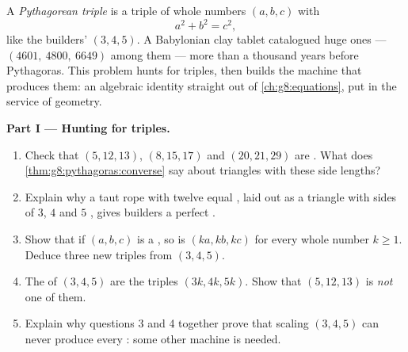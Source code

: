 \begin{problem}[{Weekend problem --- whole-number right triangles,
and the identity $(m^2 - n^2)^2 + (2mn)^2 = (m^2 + n^2)^2$ that
generates them all}]
\label{pb:g8:pythagoras:1}
A \emph{Pythagorean triple} is a triple
of whole numbers $(a, b, c)$ with
\[
a^2 + b^2 = c^2 ,
\]
like the builders' $(3, 4, 5)$. A Babylonian clay tablet catalogued
huge ones --- $(4601,\ 4800,\ 6649)$ among them --- more than a
thousand years before Pythagoras. This problem hunts for triples,
then builds the machine that produces them: an algebraic identity
straight out of \cref{ch:g8:equations}, put in the service of
geometry.

\medskip
\noindent\textbf{Part I --- Hunting for triples.}
\begin{enumerate}
  \item Check that $(5, 12, 13)$, $(8, 15, 17)$ and
        $(20, 21, 29)$ are . What does
        \cref{thm:g8:pythagoras:converse} say about triangles with
        these side lengths?
  \item Explain why a taut rope with twelve equal , laid
        out as a triangle with sides of $3$, $4$ and $5$ ,
        gives builders a perfect .
  \item Show that if $(a, b, c)$ is a , so is
        $(ka, kb, kc)$ for every whole number $k \geq 1$. Deduce
        three new triples from $(3, 4, 5)$.
  \item The  of $(3, 4, 5)$ are the triples
        $(3k, 4k, 5k)$. Show that $(5, 12, 13)$ is \emph{not} one
        of them.
  \item Explain why questions 3 and 4 together prove that scaling
        $(3, 4, 5)$ can never produce every :
        some other machine is needed.
\end{enumerate}


\end{problem}
